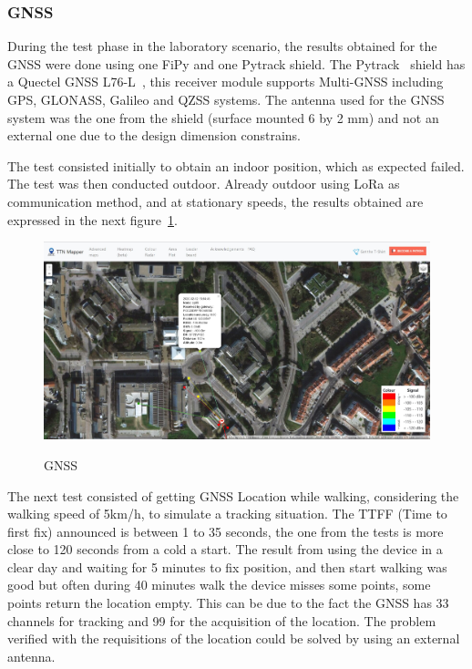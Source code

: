 \subsubsection{GNSS}
\label{subsubsec:Geo_GNSS}
During the test phase in the laboratory scenario, the results obtained for the GNSS were done using one FiPy and one Pytrack shield. The Pytrack~\cite{PytrackSpecs} shield has a Quectel GNSS L76-L~\cite{quectel,quectelspecs}, this receiver module supports Multi-GNSS including GPS, GLONASS, Galileo and QZSS systems. The antenna used for the GNSS system was the one from the shield (surface mounted 6 by 2 mm) and not an external one due to the design dimension constrains.

The test consisted initially to obtain an indoor position, which as expected failed. The test was then conducted outdoor. Already outdoor using LoRa as communication method, and at stationary speeds, the results obtained are expressed in the next figure~\ref{fig:GNSS_points}.

\begin{figure}[htbp]
  \centering

    {\includegraphics[width=0.7\linewidth]{Chapters/Figures/ttnmappergps.JPG}}%

  \caption{GNSS }
  \label{fig:GNSS_points}
\end{figure}

The next test consisted of getting  GNSS Location while walking, considering the walking speed of 5km/h, to simulate a tracking situation. The TTFF (Time to first fix) announced is between 1 to 35 seconds, the one from the tests is more close to 120 seconds from a cold a start. The result from using the device in a clear day and waiting for 5 minutes to fix position, and then start walking was good but often during 40 minutes walk the device misses some points, some points return the location empty. This can be due to the fact the GNSS has 33 channels for tracking and 99 for the acquisition of the location. The problem verified with the requisitions of the location could be solved by using an external antenna.

